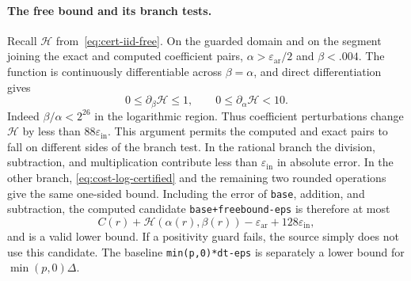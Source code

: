 \paragraph{The free bound and its branch tests.}
Recall $\mathcal H$ from~\eqref{eq:cert-iid-free}.
On the guarded domain and on the segment joining the exact and computed
coefficient pairs, $\alpha>\varepsilon_{\mathrm{ar}}/2$ and
$\beta<.004$.  The function is continuously differentiable across
$\beta=\alpha$, and direct differentiation gives
\[
 0\le\partial_\beta \mathcal H\le1,\qquad
 0\le\partial_\alpha \mathcal H<10.
\]
Indeed $\beta/\alpha<2^{26}$ in the logarithmic region.  Thus coefficient
perturbations change $\mathcal H$ by less than
$88\varepsilon_{\mathrm{in}}$.  This argument permits the computed and
exact pairs to fall on different sides of the branch test.
In the rational branch the division, subtraction, and multiplication
contribute less than $\varepsilon_{\mathrm{in}}$ in absolute error.
In the other branch, \eqref{eq:cost-log-certified} and the remaining two
rounded operations give the same one-sided bound.
Including the error of \texttt{base}, addition, and subtraction, the
computed candidate \texttt{base+freebound-eps} is therefore at most
\[
 C(r)+\mathcal H(\alpha(r),\beta(r))
       -\varepsilon_{\mathrm{ar}}+128\varepsilon_{\mathrm{in}},
\]
and is a valid lower bound.  If a positivity guard fails, the source simply
does not use this candidate.  The baseline \texttt{min(p,0)*dt-eps}
is separately a lower bound for $\min(p,0)\Delta$.

